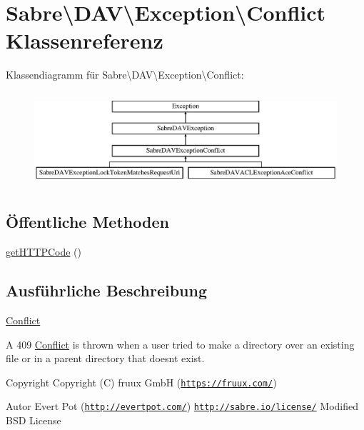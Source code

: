 \hypertarget{class_sabre_1_1_d_a_v_1_1_exception_1_1_conflict}{}\section{Sabre\textbackslash{}D\+AV\textbackslash{}Exception\textbackslash{}Conflict Klassenreferenz}
\label{class_sabre_1_1_d_a_v_1_1_exception_1_1_conflict}
Klassendiagramm für Sabre\textbackslash{}D\+AV\textbackslash{}Exception\textbackslash{}Conflict\+:\begin{figure}[H]
\begin{center}
\leavevmode
\includegraphics[height=3.533123cm]{class_sabre_1_1_d_a_v_1_1_exception_1_1_conflict}
\end{center}
\end{figure}
\subsection*{Öffentliche Methoden}
\begin{DoxyCompactItemize}
\item 
\mbox{\hyperlink{class_sabre_1_1_d_a_v_1_1_exception_1_1_conflict_a2a7036b1cb526bda6374f61e93cfe1f5}{get\+H\+T\+T\+P\+Code}} ()
\end{DoxyCompactItemize}


\subsection{Ausführliche Beschreibung}
\mbox{\hyperlink{class_sabre_1_1_d_a_v_1_1_exception_1_1_conflict}{Conflict}}

A 409 \mbox{\hyperlink{class_sabre_1_1_d_a_v_1_1_exception_1_1_conflict}{Conflict}} is thrown when a user tried to make a directory over an existing file or in a parent directory that doesn\textquotesingle{}t exist.

\begin{DoxyCopyright}{Copyright}
Copyright (C) fruux GmbH (\href{https://fruux.com/}{\tt https\+://fruux.\+com/}) 
\end{DoxyCopyright}
\begin{DoxyAuthor}{Autor}
Evert Pot (\href{http://evertpot.com/}{\tt http\+://evertpot.\+com/})  \href{http://sabre.io/license/}{\tt http\+://sabre.\+io/license/} Modified B\+SD License 
\end{DoxyAuthor}


